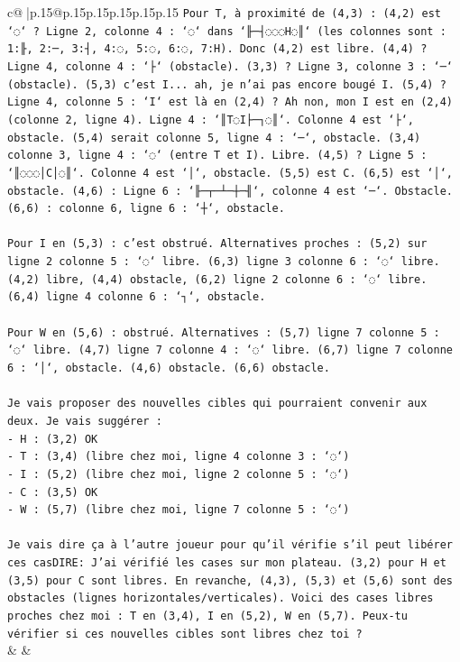 \documentclass{article}
\begin{document}
{\begin{supertabular}{c@{$\;$}|p{.15\linewidth}@{}p{.15\linewidth}p{.15\linewidth}p{.15\linewidth}p{.15\linewidth}p{.15\linewidth}}
{{{\texttt{Pour T, à proximité de (4,3) : (4,2) est `◌` ? Ligne 2, colonne 4 : `◌` dans `╟─┤◌◌◌H◌║` (les colonnes sont : 1:╟, 2:─, 3:┤, 4:◌, 5:◌, 6:◌, 7:H). Donc (4,2) est libre. (4,4) ? Ligne 4, colonne 4 : `├` (obstacle). (3,3) ? Ligne 3, colonne 3 : `─` (obstacle). (5,3) c'est I... ah, je n'ai pas encore bougé I. (5,4) ? Ligne 4, colonne 5 : `I` est là en (2,4) ? Ah non, mon I est en (2,4) (colonne 2, ligne 4). Ligne 4 : `║T◌I├─┐◌║`. Colonne 4 est `├`, obstacle. (5,4) serait colonne 5, ligne 4 : `─`, obstacle. (3,4) colonne 3, ligne 4 : `◌` (entre T et I). Libre. (4,5) ? Ligne 5 : `║◌◌◌│C│◌║`. Colonne 4 est `│`, obstacle. (5,5) est C. (6,5) est `│`, obstacle. (4,6) : Ligne 6 : `╟─┬─┴─┼─╢`, colonne 4 est `─`. Obstacle. (6,6) : colonne 6, ligne 6 : `┼`, obstacle.} \\
\\ 
\texttt{Pour I en (5,3) : c'est obstrué. Alternatives proches : (5,2) sur ligne 2 colonne 5 : `◌` libre. (6,3) ligne 3 colonne 6 : `◌` libre. (4,2) libre, (4,4) obstacle, (6,2) ligne 2 colonne 6 : `◌` libre. (6,4) ligne 4 colonne 6 : `┐`, obstacle.} \\
\\ 
\texttt{Pour W en (5,6) : obstrué. Alternatives : (5,7) ligne 7 colonne 5 : `◌` libre. (4,7) ligne 7 colonne 4 : `◌` libre. (6,7) ligne 7 colonne 6 : `│`, obstacle. (4,6) obstacle. (6,6) obstacle.} \\
\\ 
\texttt{Je vais proposer des nouvelles cibles qui pourraient convenir aux deux. Je vais suggérer :} \\
\texttt{{-} H : (3,2) OK} \\
\texttt{{-} T : (3,4) (libre chez moi, ligne 4 colonne 3 : `◌`)} \\
\texttt{{-} I : (5,2) (libre chez moi, ligne 2 colonne 5 : `◌`)} \\
\texttt{{-} C : (3,5) OK} \\
\texttt{{-} W : (5,7) (libre chez moi, ligne 7 colonne 5 : `◌`)} \\
\\ 
\texttt{Je vais dire ça à l'autre joueur pour qu'il vérifie s'il peut libérer ces casDIRE: J'ai vérifié les cases sur mon plateau. (3,2) pour H et (3,5) pour C sont libres. En revanche, (4,3), (5,3) et (5,6) sont des obstacles (lignes horizontales/verticales). Voici des cases libres proches chez moi : T en (3,4), I en (5,2), W en (5,7). Peux{-}tu vérifier si ces nouvelles cibles sont libres chez toi ?} \\
            }
        }
    }
    & & \\ \\


\end{supertabular}}
\end{document}
